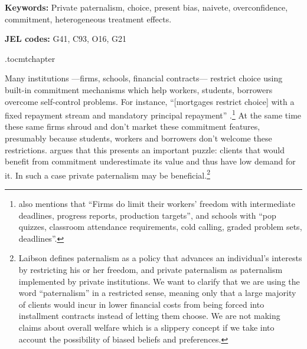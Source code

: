 \documentclass[oneside,11pt]{article}
\begin{document}
\vspace{.3in}

\textbf{Keywords: } Private paternalism, choice, present bias, naivete, overconfidence, commitment, heterogeneous treatment effects.

\textbf{JEL codes:} G41, C93, O16, G21

\newpage

\etocdepthtag.toc{mtchapter}






Many institutions ---firms, schools, financial contracts--- restrict choice using built-in commitment mechanisms which help workers, students, borrowers overcome self-control problems. For instance, ``[mortgages restrict choice] with a fixed repayment stream and mandatory principal repayment'' \citep{Laibson2018}.\footnote{\cite{Laibson2018} also mentions that ``Firms do limit their workers' freedom with intermediate deadlines, progress reports, production targets'', and schools with ``pop quizzes, classroom attendance requirements, cold calling, graded problem sets, deadlines''.} At the same time  these same firms shroud and don't market these commitment features, presumably because students, workers and borrowers don't welcome these restrictions. \cite{Laibson2018} argues that this presents an important puzzle: clients that would benefit from commitment underestimate its value and thus have low demand for it. In such a case private paternalism may be beneficial.\footnote{Laibson defines paternalism as a policy that advances an individual's interests by restricting his or her freedom, and private paternalism as paternalism implemented by private institutions. %
We want to clarify that we are using the word ``paternalism'' in a restricted sense, meaning only that a large majority of clients would incur in lower financial costs from being forced into installment contracts instead of letting them choose. We are not making claims about overall welfare which is a slippery concept if we take into account the possibility of biased beliefs and preferences.} 
\end{document}
